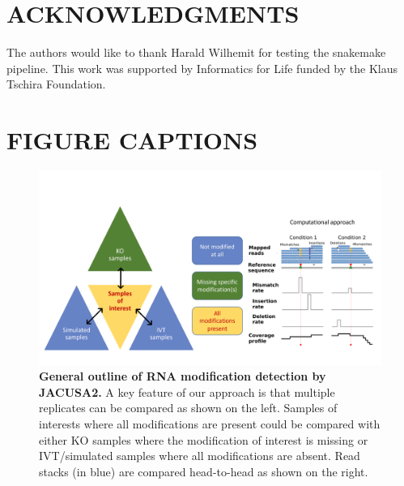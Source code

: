 \documentclass[times, 11pt, a4paper]{article}
\begin{document}
\section*{ACKNOWLEDGMENTS}
  The authors would like to thank Harald Wilhemit for testing the snakemake pipeline.
  This work was supported by Informatics for Life funded by the Klaus Tschira Foundation.

 

\newpage

\section*{FIGURE CAPTIONS}

\begin{figure}[h!]
    \includegraphics[width = 1\textwidth]{Figure1.pdf}
  \caption{\textbf{General outline of RNA modification detection by JACUSA2.} A key feature of our approach is that multiple replicates can be compared as shown on the left. Samples of interests where all modifications are present could be compared with either KO samples where the modification of interest is missing or IVT/simulated samples where all modifications are absent. Read stacks (in blue) are compared head-to-head as shown on the right. }
  \label{fig:graphicsummary}
      \end{figure}
\newpage
\end{document}
